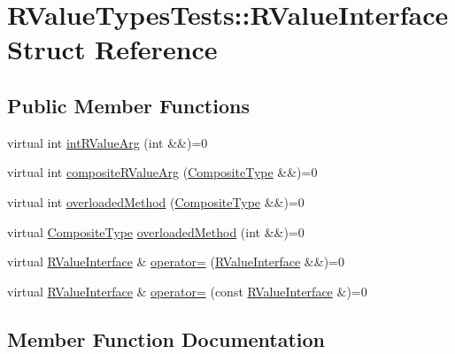 \hypertarget{structRValueTypesTests_1_1RValueInterface}{}\section{R\+Value\+Types\+Tests\+::R\+Value\+Interface Struct Reference}
\label{structRValueTypesTests_1_1RValueInterface}
\subsection*{Public Member Functions}
\begin{DoxyCompactItemize}
\item 
virtual int \mbox{\hyperlink{structRValueTypesTests_1_1RValueInterface_ad3ff6c3ad1345af273452f15b45ce3cb}{int\+R\+Value\+Arg}} (int \&\&)=0
\item 
virtual int \mbox{\hyperlink{structRValueTypesTests_1_1RValueInterface_a6ac4e860ed8c367485030143137a7e79}{composite\+R\+Value\+Arg}} (\mbox{\hyperlink{structRValueTypesTests_ae0674508758cee5fa643063720d87a20}{Composite\+Type}} \&\&)=0
\item 
virtual int \mbox{\hyperlink{structRValueTypesTests_1_1RValueInterface_a89d9f0326bd3cc69e8b15a9ebc4ed9a1}{overloaded\+Method}} (\mbox{\hyperlink{structRValueTypesTests_ae0674508758cee5fa643063720d87a20}{Composite\+Type}} \&\&)=0
\item 
virtual \mbox{\hyperlink{structRValueTypesTests_ae0674508758cee5fa643063720d87a20}{Composite\+Type}} \mbox{\hyperlink{structRValueTypesTests_1_1RValueInterface_a5329ae8483de87a3031eb874a485c1e4}{overloaded\+Method}} (int \&\&)=0
\item 
virtual \mbox{\hyperlink{structRValueTypesTests_1_1RValueInterface}{R\+Value\+Interface}} \& \mbox{\hyperlink{structRValueTypesTests_1_1RValueInterface_a3d6e9a5362141e9d2dedfb4d6a6e6bbb}{operator=}} (\mbox{\hyperlink{structRValueTypesTests_1_1RValueInterface}{R\+Value\+Interface}} \&\&)=0
\item 
virtual \mbox{\hyperlink{structRValueTypesTests_1_1RValueInterface}{R\+Value\+Interface}} \& \mbox{\hyperlink{structRValueTypesTests_1_1RValueInterface_a7942971ea7db3c73922263c5e5a5bc88}{operator=}} (const \mbox{\hyperlink{structRValueTypesTests_1_1RValueInterface}{R\+Value\+Interface}} \&)=0
\end{DoxyCompactItemize}


\subsection{Member Function Documentation}
\mbox{\label{structRValueTypesTests_1_1RValueInterface_a6ac4e860ed8c367485030143137a7e79}} 
